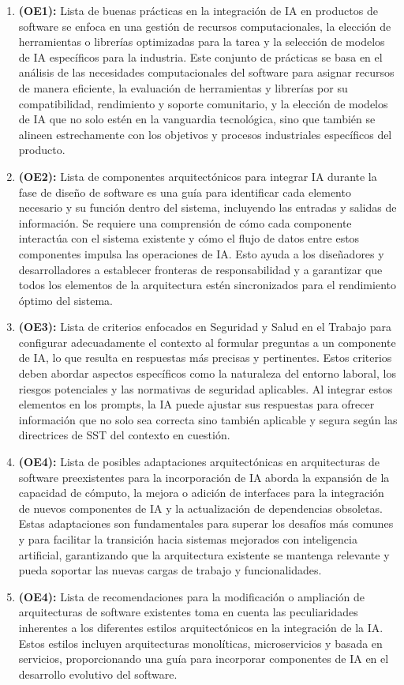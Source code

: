 \begin{enumerate}[label=\textbf{R\arabic*}]
    \item \textbf{(OE1):} Lista de buenas prácticas en la integración de IA en productos de software se enfoca en una gestión de recursos computacionales, la elección de herramientas o librerías optimizadas para la tarea y la selección de modelos de IA específicos para la industria. Este conjunto de prácticas se basa en el análisis de las necesidades computacionales del software para asignar recursos de manera eficiente, la evaluación de herramientas y librerías por su compatibilidad, rendimiento y soporte comunitario, y la elección de modelos de IA que no solo estén en la vanguardia tecnológica, sino que también se alineen estrechamente con los objetivos y procesos industriales específicos del producto.
    \item \textbf{(OE2):} Lista de componentes arquitectónicos para integrar IA durante la fase de diseño de software es una guía para identificar cada elemento necesario y su función dentro del sistema, incluyendo las entradas y salidas de información. Se requiere una comprensión de cómo cada componente interactúa con el sistema existente y cómo el flujo de datos entre estos componentes impulsa las operaciones de IA. Esto ayuda a los diseñadores y desarrolladores a establecer fronteras de responsabilidad y a garantizar que todos los elementos de la arquitectura estén sincronizados para el rendimiento óptimo del sistema.
    \item \textbf{(OE3):} Lista de criterios enfocados en Seguridad y Salud en el Trabajo para configurar adecuadamente el contexto al formular preguntas a un componente de IA, lo que resulta en respuestas más precisas y pertinentes. Estos criterios deben abordar aspectos específicos como la naturaleza del entorno laboral, los riesgos potenciales y las normativas de seguridad aplicables. Al integrar estos elementos en los prompts, la IA puede ajustar sus respuestas para ofrecer información que no solo sea correcta sino también aplicable y segura según las directrices de SST del contexto en cuestión.
    \item \textbf{(OE4):} Lista de posibles adaptaciones arquitectónicas en arquitecturas de software preexistentes para la incorporación de IA aborda la expansión de la capacidad de cómputo, la mejora o adición de interfaces para la integración de nuevos componentes de IA y la actualización de dependencias obsoletas. Estas adaptaciones son fundamentales para superar los desafíos más comunes y para facilitar la transición hacia sistemas mejorados con inteligencia artificial, garantizando que la arquitectura existente se mantenga relevante y pueda soportar las nuevas cargas de trabajo y funcionalidades.
    \item \textbf{(OE4):} Lista de recomendaciones para la modificación o ampliación de arquitecturas de software existentes toma en cuenta las peculiaridades inherentes a los diferentes estilos arquitectónicos en la integración de la IA. Estos estilos incluyen arquitecturas monolíticas, microservicios y basada en servicios, proporcionando una guía para incorporar componentes de IA en el desarrollo evolutivo del software.
\end{enumerate}


